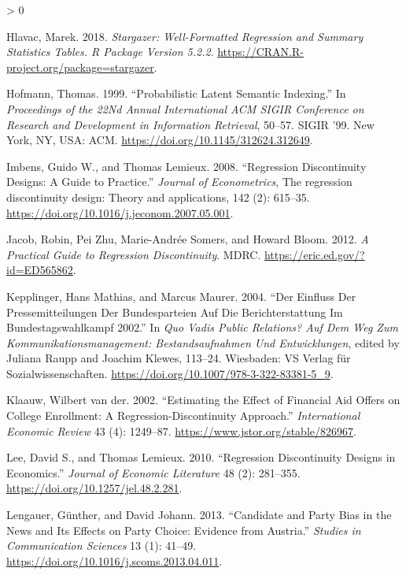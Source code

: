 \documentclass[
  12pt,
]{article}
\newlength{\cslhangindent}
\newenvironment{CSLReferences}[2] %
 {%
  \setlength{\parindent}{0pt}
  \ifodd #1 \everypar{\setlength{\hangindent}{\cslhangindent}}\ignorespaces\fi
  \ifnum #2 > 0
  \setlength{\parskip}{#2\baselineskip}
  \fi
 }%
 {}
\begin{document}
\begin{CSLReferences}{1}{0}
\leavevmode\hypertarget{ref-hlavac_stargazer_2018}{}%
Hlavac, Marek. 2018. \emph{Stargazer: Well-Formatted Regression and
Summary Statistics Tables. R Package Version 5.2.2}.
\url{https://CRAN.R-project.org/package=stargazer}.

\leavevmode\hypertarget{ref-hofmann_probabilistic_1999}{}%
Hofmann, Thomas. 1999. {``Probabilistic Latent Semantic Indexing.''} In
\emph{Proceedings of the 22Nd Annual International {ACM} {SIGIR}
Conference on Research and Development in Information Retrieval},
50--57. {SIGIR} '99. New York, {NY}, {USA}: {ACM}.
\url{https://doi.org/10.1145/312624.312649}.

\leavevmode\hypertarget{ref-imbens_regression_2008}{}%
Imbens, Guido W., and Thomas Lemieux. 2008. {``Regression Discontinuity
Designs: A Guide to Practice.''} \emph{Journal of Econometrics}, The
regression discontinuity design: Theory and applications, 142 (2):
615--35. \url{https://doi.org/10.1016/j.jeconom.2007.05.001}.

\leavevmode\hypertarget{ref-jacob_practical_2012}{}%
Jacob, Robin, Pei Zhu, Marie-Andrée Somers, and Howard Bloom. 2012.
\emph{A Practical Guide to Regression Discontinuity}. {MDRC}.
\url{https://eric.ed.gov/?id=ED565862}.

\leavevmode\hypertarget{ref-kepplinger_einfluss_2004}{}%
Kepplinger, Hans Mathias, and Marcus Maurer. 2004. {``Der Einfluss Der
Pressemitteilungen Der Bundesparteien Auf Die Berichterstattung Im
Bundestagswahlkampf 2002.''} In \emph{Quo Vadis Public Relations? Auf
Dem Weg Zum Kommunikationsmanagement: Bestandsaufnahmen Und
Entwicklungen}, edited by Juliana Raupp and Joachim Klewes, 113--24.
Wiesbaden: {VS} Verlag für Sozialwissenschaften.
\url{https://doi.org/10.1007/978-3-322-83381-5_9}.

\leavevmode\hypertarget{ref-van_der_klaauw_estimating_2002}{}%
Klaauw, Wilbert van der. 2002. {``Estimating the Effect of Financial Aid
Offers on College Enrollment: A Regression-Discontinuity Approach.''}
\emph{International Economic Review} 43 (4): 1249--87.
\url{https://www.jstor.org/stable/826967}.

\leavevmode\hypertarget{ref-lee_regression_2010}{}%
Lee, David S., and Thomas Lemieux. 2010. {``Regression Discontinuity
Designs in Economics.''} \emph{Journal of Economic Literature} 48 (2):
281--355. \url{https://doi.org/10.1257/jel.48.2.281}.

\leavevmode\hypertarget{ref-lengauer_candidate_2013}{}%
Lengauer, Günther, and David Johann. 2013. {``Candidate and Party Bias
in the News and Its Effects on Party Choice: Evidence from Austria.''}
\emph{Studies in Communication Sciences} 13 (1): 41--49.
\url{https://doi.org/10.1016/j.scoms.2013.04.011}.


\end{CSLReferences}
\end{document}
